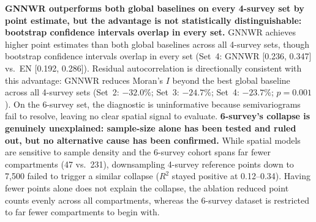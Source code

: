 \documentclass[logo,msc,ai]{infthesis}           %
\begin{document}
\textbf{GNNWR outperforms both global baselines on every 4-survey set by point estimate, but the advantage is not statistically distinguishable: bootstrap confidence intervals overlap in every set.} GNNWR achieves higher point estimates than both global baselines across all 4-survey sets, though bootstrap confidence intervals overlap in every set (Set~4: GNNWR [0.236, 0.347] vs.\ EN [0.192, 0.286]). Residual autocorrelation is directionally consistent with this advantage: GNNWR reduces Moran's $I$ beyond the best global baseline across all 4-survey sets (Set~2: $-32.0\%$; Set~3: $-24.7\%$; Set~4: $-23.7\%$; $p = 0.001$). %
On the 6-survey set, the diagnostic is uninformative because semivariograms fail to resolve, leaving no clear spatial signal to evaluate. \textbf{6-survey's collapse is genuinely unexplained: sample-size alone has been tested and ruled out, but no alternative cause has been confirmed.} While spatial models are sensitive to sample density \cite{brunsdon1996Geographically_C6_GWR} and the 6-survey cohort spans far fewer compartments (47 vs.\ 231), downsampling 4-survey reference points down to 7,500 failed to trigger a similar collapse ($R^2$ stayed positive at 0.12--0.34). Having fewer points alone does not explain the collapse, the ablation reduced point counts evenly across all compartments, whereas the 6-survey dataset is restricted to far fewer compartments to begin with. %
\end{document}
